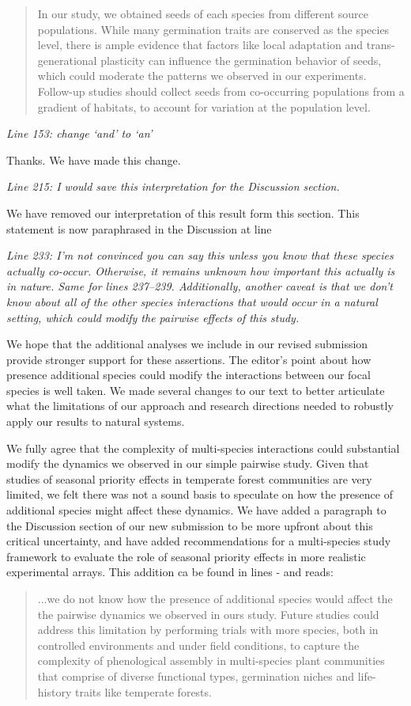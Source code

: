 \documentclass[11pt]{article}
\begin{document}
\begin{quote}In our study, we obtained seeds of each species from different source populations. While many germination traits are conserved as the species level, there is ample evidence that factors like local adaptation and trans-generational plasticity can influence the germination behavior of seeds, which could moderate the patterns we observed in our experiments. Follow-up studies should collect seeds from co-occurring populations from a gradient of habitats, to account for variation at the population level.\end{quote}

\emph{Line 153: change ‘and’ to ‘an’}

Thanks. We have made this change.

\emph{Line 215: I would save this interpretation for the Discussion section.}

We have removed our interpretation of this result form this section. This statement is now paraphrased in the Discussion at line 

\emph{Line 233:  I’m not convinced you can say this unless you know that these species actually co-occur. Otherwise, it remains unknown how important this actually is in nature. Same for lines 237–239. Additionally, another caveat is that we don’t know about all of the other species interactions that would occur in a natural setting, which could modify the pairwise effects of this study.}

We hope that the additional analyses we include in our revised submission provide stronger support for these assertions. The editor's point about how presence additional species could modify the interactions between our focal species is well taken. We made several changes to our text to better articulate what the limitations of our approach and research directions needed to robustly apply our results to natural systems.

We fully agree that the complexity of multi-species interactions could substantial modify the dynamics we observed in our simple pairwise study. Given that studies of seasonal priority effects in temperate forest communities are very limited, we felt there was not a sound basis to speculate on how the presence of additional species might affect these dynamics. We have added a paragraph to the Discussion section of our new submission to be more upfront about this critical uncertainty, and have added recommendations for a multi-species study framework to evaluate the role of seasonal priority effects in more realistic experimental arrays. This addition ca be found in lines - and reads:
\begin{quote}...we do not know how the presence of additional species would affect the the pairwise dynamics we observed in ours study. Future studies could address this limitation by performing trials with more species, both in controlled environments and under field conditions, to capture the complexity of phenological assembly in multi-species plant communities that comprise of diverse functional types, germination niches and life-history traits like temperate forests.\end{quote}
\end{document}
